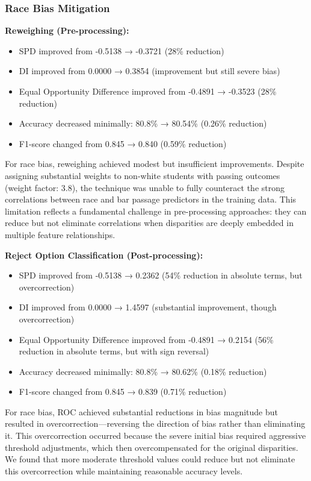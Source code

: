\documentclass[10pt,journal,compsoc]{IEEEtran}
\begin{document}
\subsubsection{Race Bias Mitigation}
\textbf{Reweighing (Pre-processing):}
\begin{itemize}
\item SPD improved from -0.5138 → -0.3721 (28\% reduction)
\item DI improved from 0.0000 → 0.3854 (improvement but still severe bias)
\item Equal Opportunity Difference improved from -0.4891 → -0.3523 (28\% reduction)
\item Accuracy decreased minimally: 80.8\% → 80.54\% (0.26\% reduction)
\item F1-score changed from 0.845 → 0.840 (0.59\% reduction)
\end{itemize}

For race bias, reweighing achieved modest but insufficient improvements. Despite assigning substantial weights to non-white students with passing outcomes (weight factor: 3.8), the technique was unable to fully counteract the strong correlations between race and bar passage predictors in the training data. This limitation reflects a fundamental challenge in pre-processing approaches: they can reduce but not eliminate correlations when disparities are deeply embedded in multiple feature relationships.

\textbf{Reject Option Classification (Post-processing):}
\begin{itemize}
\item SPD improved from -0.5138 → 0.2362 (54\% reduction in absolute terms, but overcorrection)
\item DI improved from 0.0000 → 1.4597 (substantial improvement, though overcorrection)
\item Equal Opportunity Difference improved from -0.4891 → 0.2154 (56\% reduction in absolute terms, but with sign reversal)
\item Accuracy decreased minimally: 80.8\% → 80.62\% (0.18\% reduction)
\item F1-score changed from 0.845 → 0.839 (0.71\% reduction)
\end{itemize}

For race bias, ROC achieved substantial reductions in bias magnitude but resulted in overcorrection—reversing the direction of bias rather than eliminating it. This overcorrection occurred because the severe initial bias required aggressive threshold adjustments, which then overcompensated for the original disparities. We found that more moderate threshold values could reduce but not eliminate this overcorrection while maintaining reasonable accuracy levels.
\end{document}
